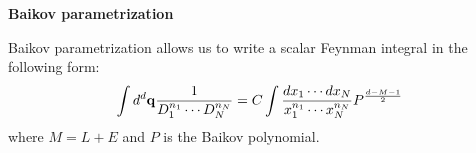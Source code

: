 \documentclass[10pt]{article}
\begin{document}
\textbf{Baikov parametrization}

Baikov parametrization allows us to write a scalar Feynman integral in the following form:
\begin{eqnarray}
\int d^d \bold{q} \frac{1}{D_1^{n_1} \cdots D_N^{n_N}}
=
C \int \frac{dx_1 \cdots dx_N}{x_1^{n_1}\cdots x_N^{n_N}} P^{\frac{d-M-1}{2}}
\end{eqnarray}
where $M = L+E$ and $P$ is the Baikov polynomial.
\end{document}
